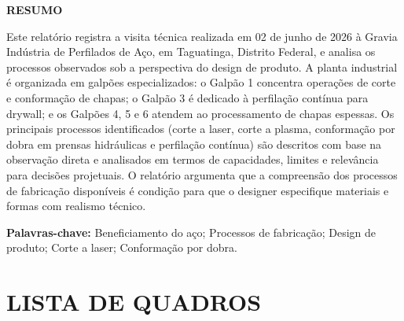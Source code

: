 \documentclass[
  12pt,
  a4paper,
  oneside,
  brazil,
  chapter=TITLE
]{article}
\makeatletter
\newcommand{\secbreak}{\clearpage}
\let\oldsection\section
\renewcommand{\section}{\secbreak\oldsection}
\renewcommand{\listofquadros}{%
  \section*{LISTA DE QUADROS}%
  \@starttoc{loq}%
}
\makeatother
\begin{document}
\clearpage
\thispagestyle{empty}
\begin{center}
  {\normalsize\bfseries RESUMO}
\end{center}

\vspace{1em}
\noindent
Este relatório registra a visita técnica realizada em 02 de junho de 2026 à Gravia Indústria de Perfilados de Aço, em Taguatinga, Distrito Federal, e analisa os processos observados sob a perspectiva do design de produto. A planta industrial é organizada em galpões especializados: o Galpão 1 concentra operações de corte e conformação de chapas; o Galpão 3 é dedicado à perfilação contínua para drywall; e os Galpões 4, 5 e 6 atendem ao processamento de chapas espessas. Os principais processos identificados (corte a laser, corte a plasma, conformação por dobra em prensas hidráulicas e perfilação contínua) são descritos com base na observação direta e analisados em termos de capacidades, limites e relevância para decisões projetuais. O relatório argumenta que a compreensão dos processos de fabricação disponíveis é condição para que o designer especifique materiais e formas com realismo técnico.

\vspace{1em}
\noindent\textbf{Palavras-chave:} Beneficiamento do aço; Processos de fabricação; Design de produto; Corte a laser; Conformação por dobra.

\clearpage
\thispagestyle{empty}
\renewcommand{\listfigurename}{LISTA DE FIGURAS}
\listoffigures

\clearpage
\thispagestyle{empty}
\listofquadros

\clearpage
\thispagestyle{empty}
\tableofcontents

\end{document}
